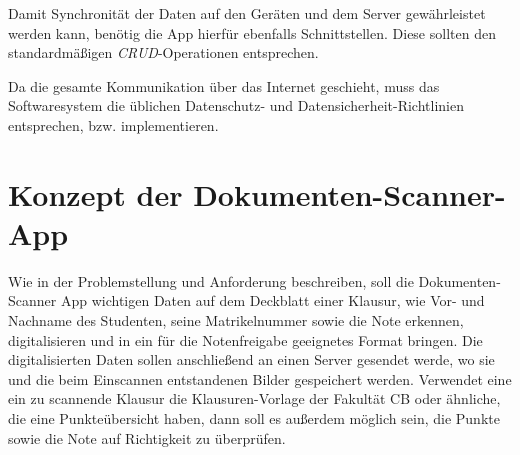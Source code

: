 \documentclass[nomenclature, 150]{HSMW-Thesis}
\begin{document}
	Damit Synchronität der Daten auf den Geräten und dem Server gewährleistet werden kann, benötig die App hierfür ebenfalls Schnittstellen. Diese sollten den standardmäßigen \textit{CRUD}-Operationen entsprechen. 
	
	Da die gesamte Kommunikation über das Internet geschieht, muss das Softwaresystem die üblichen Datenschutz- und Datensicherheit-Richtlinien entsprechen, bzw. implementieren.
	


\chapter{Konzept der Dokumenten-Scanner-App}
	Wie in der Problemstellung und Anforderung beschreiben, soll die Dokumenten-Scanner App wichtigen Daten auf dem Deckblatt einer Klausur, wie Vor- und Nachname des Studenten, seine Matrikelnummer sowie die Note erkennen, digitalisieren und in ein für die Notenfreigabe geeignetes Format bringen. Die digitalisierten Daten sollen anschließend an einen Server gesendet werde, wo sie und die beim Einscannen entstandenen Bilder gespeichert werden. Verwendet eine ein zu scannende Klausur die Klausuren-Vorlage der Fakultät CB oder ähnliche, die eine Punkteübersicht haben, dann soll es außerdem möglich sein, die Punkte sowie die Note auf Richtigkeit zu überprüfen. 
\end{document}
